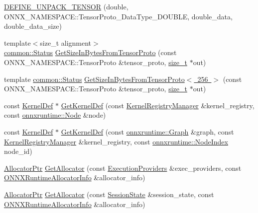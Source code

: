 \begin{DoxyCompactItemize}
\item 
\mbox{\hyperlink{namespaceonnxruntime_1_1utils_ad84e1a43162347e3dc2540869adfc10b}{D\+E\+F\+I\+N\+E\+\_\+\+U\+N\+P\+A\+C\+K\+\_\+\+T\+E\+N\+S\+OR}} (double, O\+N\+N\+X\+\_\+\+N\+A\+M\+E\+S\+P\+A\+C\+E\+::\+Tensor\+Proto\+\_\+\+Data\+Type\+\_\+\+D\+O\+U\+B\+LE, double\+\_\+data, double\+\_\+data\+\_\+size)
\item 
{\footnotesize template$<$size\+\_\+t alignment$>$ }\\\mbox{\hyperlink{classonnxruntime_1_1common_1_1Status}{common\+::\+Status}} \mbox{\hyperlink{namespaceonnxruntime_1_1utils_a2d84b5cf8a44b5c9ac8acdc0fd605544}{Get\+Size\+In\+Bytes\+From\+Tensor\+Proto}} (const O\+N\+N\+X\+\_\+\+N\+A\+M\+E\+S\+P\+A\+C\+E\+::\+Tensor\+Proto \&tensor\+\_\+proto, \mbox{\hyperlink{mlasi_8h_a503efbc1c6e50825320ad909366b78ab}{size\+\_\+t}} $\ast$out)
\item 
template \mbox{\hyperlink{classonnxruntime_1_1common_1_1Status}{common\+::\+Status}} \mbox{\hyperlink{namespaceonnxruntime_1_1utils_a1fd4746352c986ccbda401da7459ba60}{Get\+Size\+In\+Bytes\+From\+Tensor\+Proto$<$ 256 $>$}} (const O\+N\+N\+X\+\_\+\+N\+A\+M\+E\+S\+P\+A\+C\+E\+::\+Tensor\+Proto \&tensor\+\_\+proto, \mbox{\hyperlink{mlasi_8h_a503efbc1c6e50825320ad909366b78ab}{size\+\_\+t}} $\ast$out)
\item 
const \mbox{\hyperlink{classonnxruntime_1_1KernelDef}{Kernel\+Def}} $\ast$ \mbox{\hyperlink{namespaceonnxruntime_1_1utils_a7cc8827cc590f48e3cc3ef8eaa6c4f56}{Get\+Kernel\+Def}} (const \mbox{\hyperlink{classonnxruntime_1_1KernelRegistryManager}{Kernel\+Registry\+Manager}} \&kernel\+\_\+registry, const \mbox{\hyperlink{classonnxruntime_1_1Node}{onnxruntime\+::\+Node}} \&node)
\item 
const \mbox{\hyperlink{classonnxruntime_1_1KernelDef}{Kernel\+Def}} $\ast$ \mbox{\hyperlink{namespaceonnxruntime_1_1utils_a7588af1ad0ff65f7922537f1e8b76ee6}{Get\+Kernel\+Def}} (const \mbox{\hyperlink{classonnxruntime_1_1Graph}{onnxruntime\+::\+Graph}} \&graph, const \mbox{\hyperlink{classonnxruntime_1_1KernelRegistryManager}{Kernel\+Registry\+Manager}} \&kernel\+\_\+registry, const \mbox{\hyperlink{namespaceonnxruntime_af8773b5c12b5d8fd9292eb2e268df760}{onnxruntime\+::\+Node\+Index}} node\+\_\+id)
\item 
\mbox{\hyperlink{namespaceonnxruntime_a6cdac724c5dcefded3a63f08dae58fda}{Allocator\+Ptr}} \mbox{\hyperlink{namespaceonnxruntime_1_1utils_a06318e643d42f85829d91db93306ea68}{Get\+Allocator}} (const \mbox{\hyperlink{classonnxruntime_1_1ExecutionProviders}{Execution\+Providers}} \&exec\+\_\+providers, const \mbox{\hyperlink{structONNXRuntimeAllocatorInfo}{O\+N\+N\+X\+Runtime\+Allocator\+Info}} \&allocator\+\_\+info)
\item 
\mbox{\hyperlink{namespaceonnxruntime_a6cdac724c5dcefded3a63f08dae58fda}{Allocator\+Ptr}} \mbox{\hyperlink{namespaceonnxruntime_1_1utils_a1929d3a08af5b86f2040d95ea0f7a7ce}{Get\+Allocator}} (const \mbox{\hyperlink{classonnxruntime_1_1SessionState}{Session\+State}} \&session\+\_\+state, const \mbox{\hyperlink{structONNXRuntimeAllocatorInfo}{O\+N\+N\+X\+Runtime\+Allocator\+Info}} \&allocator\+\_\+info)
\end{DoxyCompactItemize}


